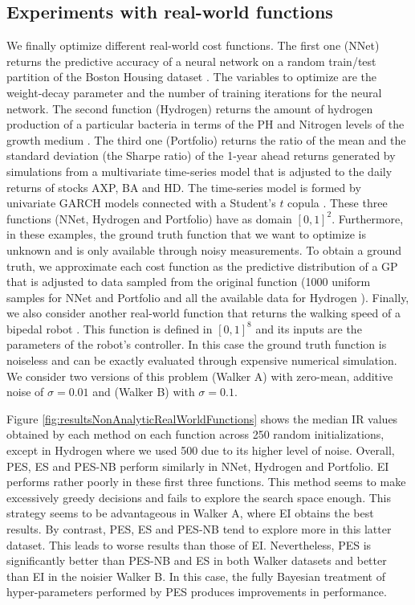 \subsection{Experiments with real-world functions}

We finally optimize different real-world cost functions. The 
first one (NNet) returns the predictive accuracy of a neural network on a random train/test partition of 
the Boston Housing dataset \cite{BacheLichman:2013}. The variables to optimize are the weight-decay parameter and the number of training
iterations for the neural network. The second function (Hydrogen) returns the amount of
hydrogen production of a particular bacteria in terms of the PH and Nitrogen levels of the growth medium \cite{Burrows:2009}.
The third one (Portfolio) returns the ratio of the mean and the standard deviation (the Sharpe ratio) of the 
1-year ahead returns generated by simulations from a multivariate time-series model that is adjusted to the daily returns of
stocks AXP, BA and HD. The time-series model is formed by univariate GARCH models connected with a Student's $t$ copula \cite{jondeau:2006}.
These three functions (NNet, Hydrogen and Portfolio) have as domain $[0,1]^2$. 
Furthermore, in these examples, the ground truth function that we want to optimize is unknown and is only available 
through noisy measurements. To obtain a ground truth, we approximate each cost function as the
predictive distribution of a GP that is adjusted to data sampled from the original function (1000 uniform samples for NNet and Portfolio
and all the available data for Hydrogen \cite{Burrows:2009}).
Finally, we also consider another real-world function that returns the walking
speed of a bipedal robot \cite{Westervelt:2007}.
This function is defined in $[0,1]^8$ and its inputs are the parameters
of the robot's controller. In this case the ground truth function is noiseless
and can be exactly evaluated through expensive numerical simulation. We consider two versions of this problem (Walker A) with zero-mean, additive noise of $\sigma=0.01$ and (Walker B) with $\sigma=0.1$.

Figure \ref{fig:resultsNonAnalyticRealWorldFunctions} shows the median IR values
obtained by each method on each function across 250 random initializations, except in Hydrogen where we used 500 due to its higher level of noise.
Overall, PES, ES and PES-NB perform similarly in NNet, Hydrogen and Portfolio.
EI performs rather poorly in these first three functions. 
This method seems to make excessively greedy decisions and fails to explore the search space enough.
This strategy seems to be advantageous in Walker A, where EI obtains the best results.
By contrast, PES, ES and PES-NB tend to explore more in this latter dataset. This leads to worse results than those of EI.
Nevertheless, PES is significantly better than PES-NB and ES in both Walker datasets and better than EI in the noisier Walker B.
In this case, the fully Bayesian treatment of hyper-parameters performed by PES produces improvements in performance.

